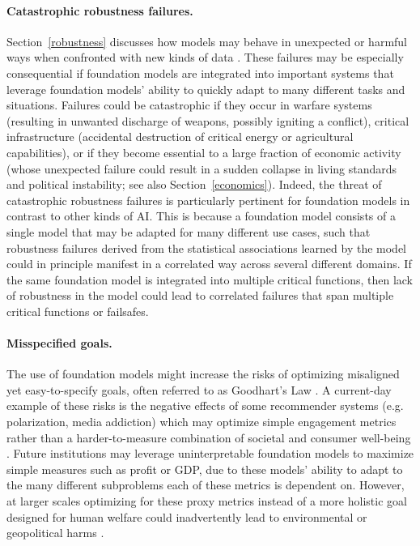 \paragraph{Catastrophic robustness failures.} Section~\ref{robustness} discusses how models may behave in unexpected or harmful ways when confronted with new kinds of data \citep{amodei2016concrete, yudkowsky2008artificial}. These failures may be especially consequential if foundation models are integrated into important systems that leverage foundation models' ability to quickly adapt to many different tasks and situations. Failures could be catastrophic if they occur in warfare systems (resulting in unwanted discharge of weapons, possibly igniting a conflict), critical infrastructure (accidental destruction of critical energy or agricultural capabilities), or if they become essential to a large fraction of economic activity (whose unexpected failure could result in a sudden collapse in living standards and political instability; see also Section~\ref{economics}). Indeed, the threat of catastrophic robustness failures is particularly pertinent for foundation models in contrast to other kinds of AI. This is because a foundation model consists of a single model that may be adapted for many different use cases, such that robustness failures derived from the statistical associations learned by the model could in principle manifest in a correlated way across several different domains. If the same foundation model is integrated into multiple critical functions, then lack of robustness in the model could lead to correlated failures that span multiple critical functions or failsafes.

\paragraph{Misspecified goals.} The use of foundation models might increase the risks of optimizing misaligned yet easy-to-specify goals, often referred to as Goodhart’s Law \citep{Kenton2021AlignmentOL, goodhart1984}. A current-day example of these risks is the negative effects of some recommender systems (e.g. polarization, media addiction) which may optimize simple engagement metrics rather than a harder-to-measure combination of societal and consumer well-being \citep{burr2018analysis, milano2020recommender}. Future institutions may leverage uninterpretable foundation models to maximize simple measures such as profit or GDP, due to these models' ability to adapt to the many different subproblems each of these metrics is dependent on. However, at larger scales optimizing for these proxy metrics instead of a more holistic goal designed for human welfare could inadvertently lead to environmental or geopolitical harms \citep{ gabriel2020artificial, creel2021}.

